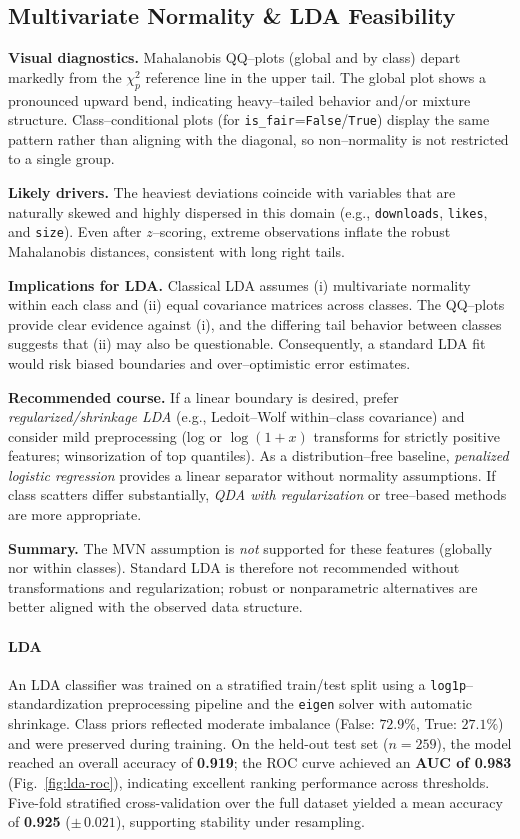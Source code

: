 \documentclass[journal]{IEEEtran}
\begin{document}
\subsection{Multivariate Normality \& LDA Feasibility}

\textbf{Visual diagnostics.} Mahalanobis QQ–plots (global and by class) depart markedly from the
$\chi^2_p$ reference line in the upper tail. The global plot shows a pronounced upward bend,
indicating heavy–tailed behavior and/or mixture structure. Class–conditional plots (for
\texttt{is\_fair}=\texttt{False}/\texttt{True}) display the same pattern rather than aligning with
the diagonal, so non–normality is not restricted to a single group.

\textbf{Likely drivers.} The heaviest deviations coincide with variables that are naturally
skewed and highly dispersed in this domain (e.g., \texttt{downloads}, \texttt{likes}, and
\texttt{size}). Even after $z$–scoring, extreme observations inflate the robust Mahalanobis
distances, consistent with long right tails.

\textbf{Implications for LDA.} Classical LDA assumes (i) multivariate normality within each
class and (ii) equal covariance matrices across classes. The QQ–plots provide clear evidence
against (i), and the differing tail behavior between classes suggests that (ii) may also be
questionable. Consequently, a standard LDA fit would risk biased boundaries and over–optimistic
error estimates.

\textbf{Recommended course.} If a linear boundary is desired, prefer \emph{regularized/shrinkage
	LDA} (e.g., Ledoit–Wolf within–class covariance) and consider mild preprocessing (log or
$\log(1+x)$ transforms for strictly positive features; winsorization of top quantiles). As a
distribution–free baseline, \emph{penalized logistic regression} provides a linear separator
without normality assumptions. If class scatters differ substantially, \emph{QDA with
	regularization} or tree–based methods are more appropriate.

\textbf{Summary.} The MVN assumption is \emph{not} supported for these features (globally nor
within classes). Standard LDA is therefore not recommended without transformations and
regularization; robust or nonparametric alternatives are better aligned with the observed data
structure.


\paragraph{LDA}
An LDA classifier was trained on a stratified train/test split using a \texttt{log1p}--standardization preprocessing pipeline and the \texttt{eigen} solver with automatic shrinkage. Class priors reflected moderate imbalance (False: $72.9\%$, True: $27.1\%$) and were preserved during training. On the held-out test set ($n=259$), the model reached an overall accuracy of \textbf{0.919}; the ROC curve achieved an \textbf{AUC of 0.983} (Fig.~\ref{fig:lda-roc}), indicating excellent ranking performance across thresholds. Five-fold stratified cross-validation over the full dataset yielded a mean accuracy of \textbf{0.925} ($\pm\,0.021$), supporting stability under resampling.
\end{document}
